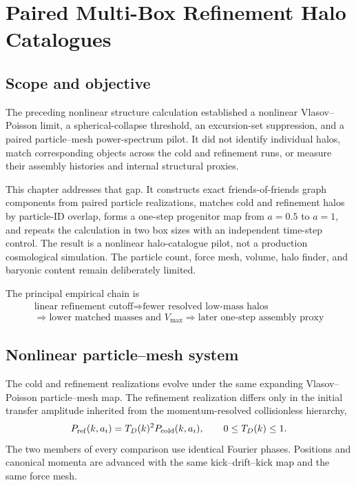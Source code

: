 \chapter{Paired Multi-Box Refinement Halo Catalogues}
\label{ch:paired-halo-catalogues}

\section{Scope and objective}

The preceding nonlinear structure calculation established a nonlinear Vlasov--Poisson limit, a spherical-collapse threshold, an excursion-set suppression, and a paired particle--mesh power-spectrum pilot.  It did not identify individual halos, match corresponding objects across the cold and refinement runs, or measure their assembly histories and internal structural proxies.

This chapter addresses that gap.  It constructs exact friends-of-friends graph components from paired particle realizations, matches cold and refinement halos by particle-ID overlap, forms a one-step progenitor map from $a=0.5$ to $a=1$, and repeats the calculation in two box sizes with an independent time-step control.  The result is a nonlinear halo-catalogue pilot, not a production cosmological simulation.  The particle count, force mesh, volume, halo finder, and baryonic content remain deliberately limited.

The principal empirical chain is
\begin{equation}
\boxed{\begin{gathered}
\text{linear refinement cutoff}
\Longrightarrow
\text{fewer resolved low-mass halos}\\
\Longrightarrow
\text{lower matched masses and }V_{\max}
\Longrightarrow
\text{later one-step assembly proxy}
\end{gathered}}
\label{eq:halo-principal-chain}
\end{equation}

\section{Nonlinear particle--mesh system}

The cold and refinement realizations evolve under the same expanding Vlasov--Poisson particle--mesh map.  The refinement realization differs only in the initial transfer amplitude inherited from the momentum-resolved collisionless hierarchy,
\begin{equation}
 P_{\rm ref}(k,a_i)=T_D(k)^2P_{\rm cold}(k,a_i),
 \qquad 0\leq T_D(k)\leq1.
\label{eq:halo-initial-power}
\end{equation}
The two members of every comparison use identical Fourier phases.  Positions and canonical momenta are advanced with the same kick--drift--kick map and the same force mesh.

